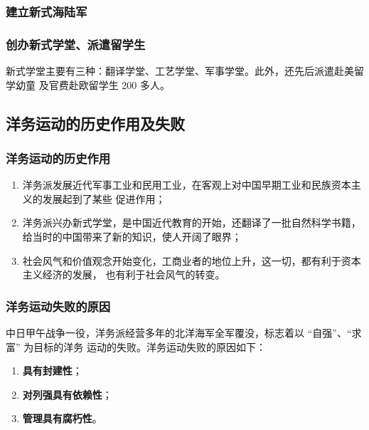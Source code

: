 \documentclass[10pt, UTF8]{book} %
\begin{document}
\subsubsection{建立新式海陆军}
\subsubsection{创办新式学堂、派遣留学生}

新式学堂主要有三种：翻译学堂、工艺学堂、军事学堂。此外，还先后派遣赴美留学幼童
及官费赴欧留学生 200 多人。

\subsection{洋务运动的历史作用及失败}

\subsubsection{洋务运动的历史作用}

\begin{enumerate}[label=(\arabic*), itemsep=0pt]
    \item 洋务派发展近代军事工业和民用工业，在客观上对中国早期工业和民族资本主义的发展起到了某些
    促进作用；
    \item 洋务派兴办新式学堂，是中国近代教育的开始，还翻译了一批自然科学书籍，
    给当时的中国带来了新的知识，使人开阔了眼界；
    \item 社会风气和价值观念开始变化，工商业者的地位上升，这一切，都有利于资本主义经济的发展，
    也有利于社会风气的转变。
\end{enumerate}

\subsubsection{洋务运动失败的原因}

中日甲午战争一役，洋务派经营多年的北洋海军全军覆没，标志着以 “自强”、“求富” 为目标的洋务
运动的失败。洋务运动失败的原因如下：
\begin{enumerate}[label=(\arabic*), itemsep=0pt]
    \item \textbf{具有封建性}；
    \item \textbf{对列强具有依赖性}；
    \item \textbf{管理具有腐朽性}。
\end{enumerate}
\end{document}

